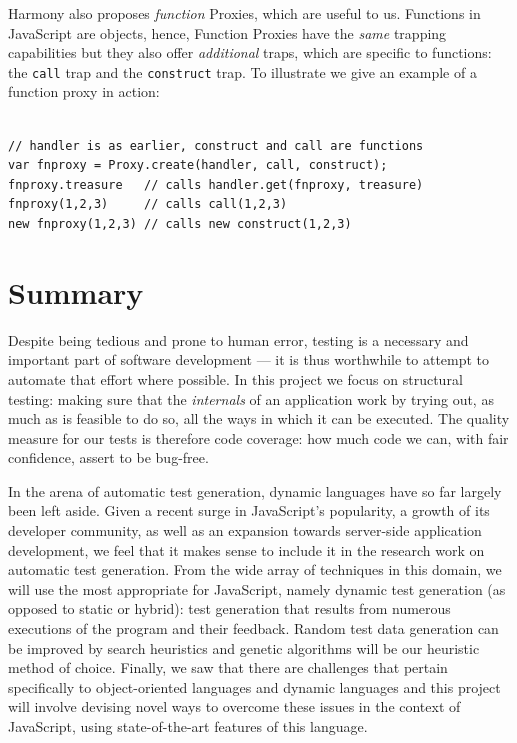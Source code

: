 Harmony also proposes \emph{function} Proxies, which are useful to us. Functions in JavaScript are objects, hence, Function Proxies have the \emph{same} trapping capabilities but they also offer \emph{additional} traps, which are specific to functions: the \texttt{call} trap and the \texttt{construct} trap. To illustrate we give an example of a function proxy in action:

\begin{lstlisting}

// handler is as earlier, construct and call are functions
var fnproxy = Proxy.create(handler, call, construct);
fnproxy.treasure   // calls handler.get(fnproxy, treasure)
fnproxy(1,2,3)     // calls call(1,2,3)
new fnproxy(1,2,3) // calls new construct(1,2,3)

\end{lstlisting}

\section{Summary}

Despite being tedious and prone to human error, testing is a necessary and important part of software development --- it is thus worthwhile to attempt to automate that effort where possible. In this project we focus on structural testing: making sure that the \emph{internals} of an application work by trying out, as much as is feasible to do so, all the ways in which it can be executed. The quality measure for our tests is therefore code coverage: how much code we can, with fair confidence, assert to be bug-free.

In the arena of automatic test generation, dynamic languages have so far largely been left aside. Given a recent surge in JavaScript's popularity, a growth of its developer community, as well as an expansion towards server-side application development, we feel that it makes sense to include it in the research work on automatic test generation. From the wide array of techniques in this domain, we will use the most appropriate for JavaScript, namely dynamic test generation (as opposed to static or hybrid): test generation that results from numerous executions of the program and their feedback. Random test data generation can be improved by search heuristics and genetic algorithms will be our heuristic method of choice. Finally, we saw that there are challenges that pertain specifically to object-oriented languages and dynamic languages and this project will involve devising novel ways to overcome these issues in the context of JavaScript, using state-of-the-art features of this language.